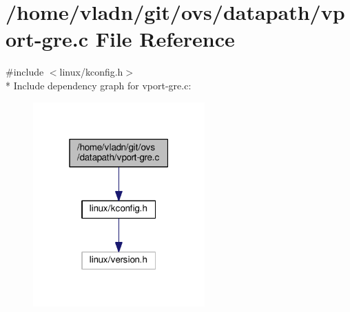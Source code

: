 \hypertarget{vport-gre_8c}{}\section{/home/vladn/git/ovs/datapath/vport-\/gre.c File Reference}
\label{vport-gre_8c}
{\ttfamily \#include $<$linux/kconfig.\+h$>$}\\*
Include dependency graph for vport-\/gre.c\+:
\nopagebreak
\begin{figure}[H]
\begin{center}
\leavevmode
\includegraphics[width=187pt]{vport-gre_8c__incl}
\end{center}
\end{figure}
